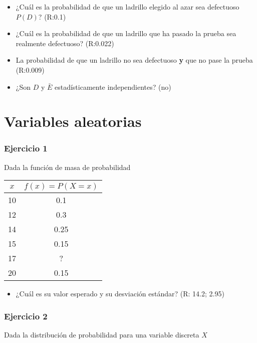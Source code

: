 \documentclass[
]{book}
\providecommand{\tightlist}{%
  \setlength{\itemsep}{0pt}\setlength{\parskip}{0pt}}
\begin{document}
\begin{itemize}
\item
  ¿Cuál es la probabilidad de que un ladrillo elegido al azar sea defectuoso \(P(D)\)? (R:0.1)
\item
  ¿Cuál es la probabilidad de que un ladrillo que ha pasado la prueba sea realmente defectuoso? (R:0.022)
\item
  La probabilidad de que un ladrillo no sea defectuoso \textbf{y} que no pase la prueba (R:0.009)
\item
  ¿Son \(D\) y \(\bar{E}\) estadísticamente independientes? (no)
\end{itemize}

\hypertarget{variables-aleatorias}{%
\section{Variables aleatorias}\label{variables-aleatorias}}

\hypertarget{ejercicio-1-3}{%
\subsubsection{Ejercicio 1}\label{ejercicio-1-3}}

Dada la función de masa de probabilidad

\begin{longtable}[]{@{}cc@{}}
\toprule
\(x\) & \(f(x)=P(X=x)\) \\
\midrule
\endhead
10 & 0.1 \\
12 & 0.3 \\
14 & 0.25 \\
15 & 0.15 \\
17 & ? \\
20 & 0.15 \\
\bottomrule
\end{longtable}

\begin{itemize}
\tightlist
\item
  ¿Cuál es su valor esperado y su desviación estándar? (R: 14.2; 2.95)
\end{itemize}

\hypertarget{ejercicio-2-3}{%
\subsubsection{Ejercicio 2}\label{ejercicio-2-3}}

Dada la distribución de probabilidad para una variable discreta \(X\)
\end{document}
